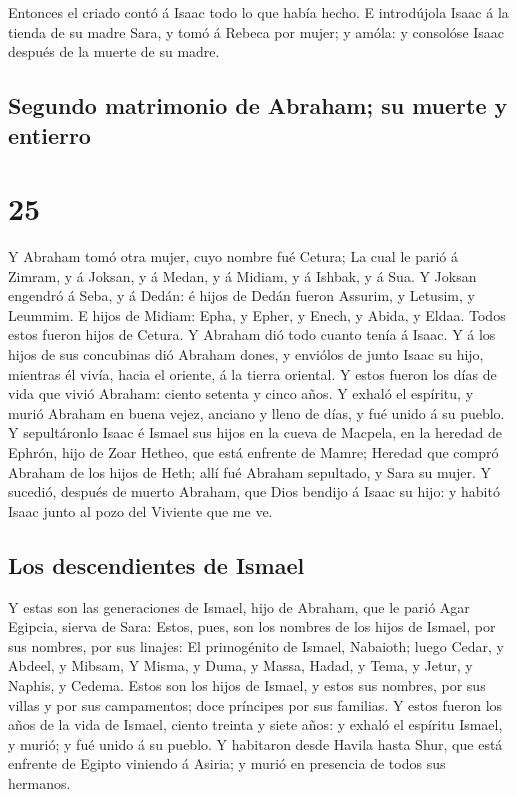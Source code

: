  Entonces el criado contó á Isaac todo lo que había
hecho.  E introdújola Isaac á la tienda de su madre Sara,
y tomó á Rebeca por mujer; y amóla: y consolóse Isaac después de la
muerte de su madre.

\hypertarget{segundo-matrimonio-de-abraham-su-muerte-y-entierro}{%
\subsection{Segundo matrimonio de Abraham; su muerte y
entierro}\label{segundo-matrimonio-de-abraham-su-muerte-y-entierro}}

\hypertarget{section-24}{%
\section{25}\label{section-24}}

 Y Abraham tomó otra mujer, cuyo nombre fué Cetura;
 La cual le parió á Zimram, y á Joksan, y á Medan, y á
Midiam, y á Ishbak, y á Sua.  Y Joksan engendró á Seba, y
á Dedán: é hijos de Dedán fueron Assurim, y Letusim, y Leummim.
 E hijos de Midiam: Epha, y Epher, y Enech, y Abida, y
Eldaa. Todos estos fueron hijos de Cetura.  Y Abraham dió
todo cuanto tenía á Isaac.  Y á los hijos de sus
concubinas dió Abraham dones, y enviólos de junto Isaac su hijo,
mientras él vivía, hacia el oriente, á la tierra oriental.
 Y estos fueron los días de vida que vivió Abraham: ciento
setenta y cinco años.  Y exhaló el espíritu, y murió
Abraham en buena vejez, anciano y lleno de días, y fué unido á su
pueblo.  Y sepultáronlo Isaac é Ismael sus hijos en la
cueva de Macpela, en la heredad de Ephrón, hijo de Zoar Hetheo, que está
enfrente de Mamre;  Heredad que compró Abraham de los
hijos de Heth; allí fué Abraham sepultado, y Sara su mujer.
 Y sucedió, después de muerto Abraham, que Dios bendijo á
Isaac su hijo: y habitó Isaac junto al pozo del Viviente que me ve.

\hypertarget{los-descendientes-de-ismael}{%
\subsection{Los descendientes de
Ismael}\label{los-descendientes-de-ismael}}

 Y estas son las generaciones de Ismael, hijo de Abraham,
que le parió Agar Egipcia, sierva de Sara:  Estos, pues,
son los nombres de los hijos de Ismael, por sus nombres, por sus
linajes: El primogénito de Ismael, Nabaioth; luego Cedar, y Abdeel, y
Mibsam,  Y Misma, y Duma, y Massa,  Hadad,
y Tema, y Jetur, y Naphis, y Cedema.  Estos son los hijos
de Ismael, y estos sus nombres, por sus villas y por sus campamentos;
doce príncipes por sus familias.  Y estos fueron los años
de la vida de Ismael, ciento treinta y siete años: y exhaló el espíritu
Ismael, y murió; y fué unido á su pueblo.  Y habitaron
desde Havila hasta Shur, que está enfrente de Egipto viniendo á Asiria;
y murió en presencia de todos sus hermanos.

